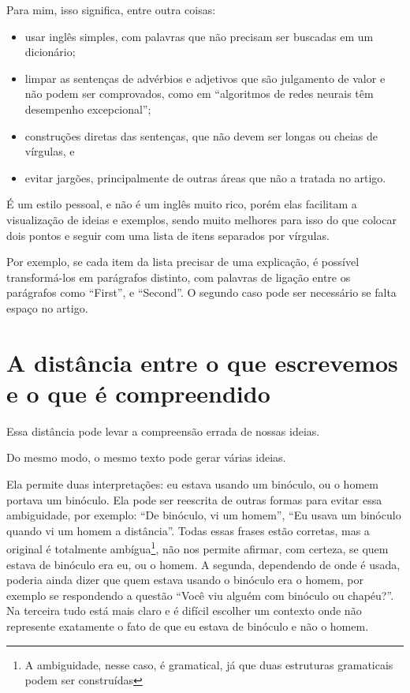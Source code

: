 \documentclass[openany]{book}
\begin{document}
 Para mim, isso significa, entre outra coisas:
\begin{itemize}
    \item usar inglês simples, com palavras que não precisam ser buscadas em um dicionário;
    \item limpar as sentenças de advérbios e adjetivos que são julgamento de valor e não podem ser comprovados, como em ``algoritmos de redes neurais têm desempenho excepcional'';
    \item construções diretas das sentenças, que não devem ser longas ou cheias de vírgulas, e
    \item evitar jargões, principalmente de outras áreas que não a tratada no artigo.
\end{itemize}

 É um estilo pessoal, e não é um inglês muito rico, porém elas facilitam a visualização de ideias e exemplos, sendo muito melhores para isso do que colocar dois pontos e seguir com uma lista de itens separados por vírgulas.

   Por exemplo, se cada item da lista precisar de uma explicação, é possível transformá-los em parágrafos distinto, com palavras de ligação entre os parágrafos como ``First'', e ``Second''. O segundo caso pode ser necessário se falta espaço no artigo.

\section{A distância entre o que escrevemos e o que é compreendido}

 Essa distância pode levar a compreensão errada de nossas ideias.

 Do mesmo modo, o mesmo texto pode gerar várias ideias.

Ela permite duas interpretações: eu estava usando um binóculo, ou o homem portava um binóculo. Ela pode ser reescrita de outras formas para evitar essa ambiguidade, por exemplo: \enquote{De binóculo, vi um homem}, \enquote{Eu usava um binóculo quando vi um homem a distância}. Todas essas frases estão corretas, mas a original é totalmente ambígua\footnote{A ambiguidade, nesse caso, é gramatical, já que duas estruturas gramaticais podem ser construídas}, não nos permite afirmar, com certeza, se quem estava de binóculo era eu, ou o homem. A segunda, dependendo de onde é usada, poderia ainda dizer que quem estava usando o binóculo era o homem, por exemplo se respondendo a questão ``Você viu alguém com binóculo ou chapéu?''.
Na terceira tudo está mais claro e é difícil escolher um contexto onde não represente exatamente o fato de que eu estava de binóculo e não o homem.
\end{document}
